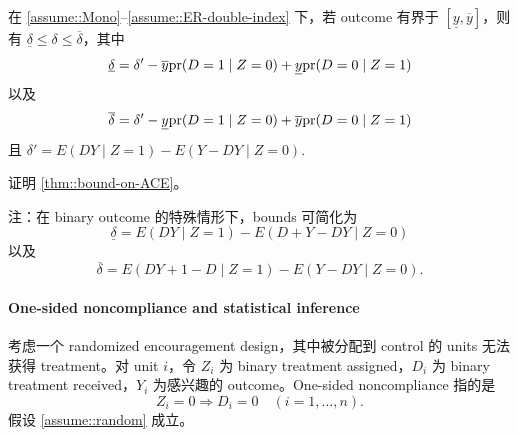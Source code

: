 \begin{theorem}
\label{thm::bound-on-ACE}
在 \cref{assume::Mono}--\cref{assume::ER-double-index} 下，若 outcome 有界于 $[\underline{y}, \overline{y}]$，则有 $\underline{\delta} \leq  \delta  \leq \overline{\delta}$，其中
$$
\underline{\delta} =  \delta'  - \overline{y} \textup{pr}(D=1\mid Z=0) + \underline{y} \textup{pr}(D=0\mid Z=1)
$$
以及
$$
\overline{\delta} = \delta'  -   \underline{y} \textup{pr}(D=1\mid Z=0) +  \overline{y}  \textup{pr}(D=0\mid Z=1) 
$$
且 $\delta' = E(DY\mid Z=1) - E(Y-DY\mid Z=0) .$
\end{theorem}

证明 \cref{thm::bound-on-ACE}。
 
 
注：在 binary outcome 的特殊情形下，bounds 可简化为
 $$
\underline{\delta} =   E(DY\mid Z=1) - E( D+Y-DY\mid Z=0)  
$$
以及
$$
\overline{\delta} =  E(DY+1-D\mid Z=1) - E(Y-DY\mid Z=0) .
 $$
 
 
 \paragraph{One-sided noncompliance and statistical inference}\label{para::15-onesidednoncompliance}
 
考虑一个 randomized encouragement design，其中被分配到 control 的 units 无法获得 treatment。对 unit $i$，令 $Z_i$ 为 binary treatment assigned，$D_i$ 为 binary treatment received，$Y_i$ 为感兴趣的 outcome。One-sided noncompliance 指的是
$$
Z_i=0 \Longrightarrow  D_i = 0 \quad (i=1,\ldots, n). 
$$
假设 \cref{assume::random} 成立。
 
